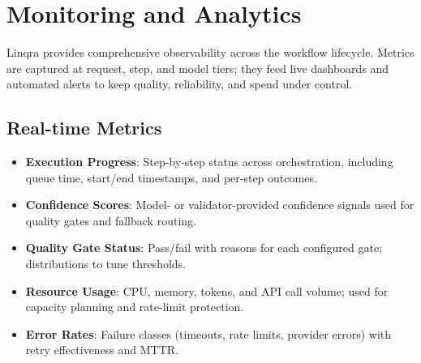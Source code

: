 \documentclass[11pt,a4paper]{article}
\begin{document}
\begin{center}
\end{center}

\newpage
\section{Monitoring and Analytics}

Linqra provides comprehensive observability across the workflow lifecycle. Metrics are captured at request, step, and model tiers; they feed live dashboards and automated alerts to keep quality, reliability, and spend under control.

\subsection{Real-time Metrics}

\begin{itemize}
    \item \textbf{Execution Progress}: Step-by-step status across orchestration, including queue time, start/end timestamps, and per-step outcomes.
    \item \textbf{Confidence Scores}: Model- or validator-provided confidence signals used for quality gates and fallback routing.
    \item \textbf{Quality Gate Status}: Pass/fail with reasons for each configured gate; distributions to tune thresholds.
    \item \textbf{Resource Usage}: CPU, memory, tokens, and API call volume; used for capacity planning and rate-limit protection.
    \item \textbf{Error Rates}: Failure classes (timeouts, rate limits, provider errors) with retry effectiveness and MTTR.
\end{itemize}
\end{document}
